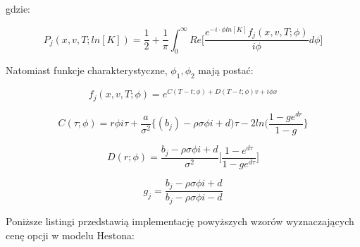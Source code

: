 \documentclass{pracamgr}
\begin{document}
gdzie:


\begin{equation}
  P_j (x, v, T; ln[K]) = \frac{1}{2} + \frac{1}{\pi} \int_{0}^{\infty} Re \bigg[ \frac{e^{-i \cdot \phi ln[K]} f_j(x, v, T; \phi) }{i \phi} d \phi \bigg]
\end{equation}

Natomiast funkcje charakterystyczne, $\phi_1, \phi_2$ mają postać: 

\begin{equation}
   f_j(x, v, T; \phi) = e^{C(T-t; \phi) + D(T-t; \phi)v + i \phi x}
\end{equation}

\begin{equation}
  C (\tau; \phi) = r \phi i \tau + \frac{a}{\sigma^2} \bigg\{ (b_j) - \rho \sigma \phi i + d) \tau - 2 ln (\frac{1 - ge^{dr}}{1-g} \bigg\}
\end{equation}

\begin{equation}
D (r; \phi)  = \frac{b_j- \rho \sigma \phi i + d}{\sigma^2} \bigg[ \frac{1 - e^{d\tau}}{1 - ge^{d\tau}} \bigg]  
\end{equation}

\begin{equation}
g_j= \frac{b_j - \rho \sigma \phi i + d}{b_j - \rho \sigma \phi i - d}
\end{equation}

Poniższe listingi przedstawią implementację powyższych wzorów wyznaczających cenę opcji w modelu Hestona:


\end{document}
